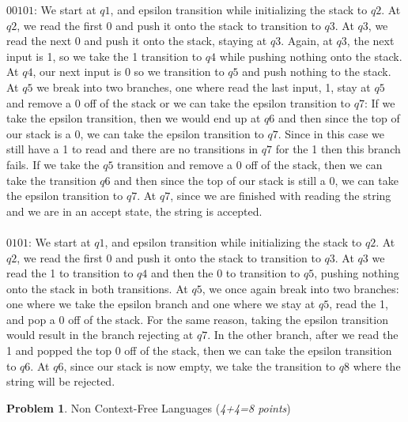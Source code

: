 \documentclass[11pt]{article}
\theoremstyle{definition}
\theoremstyle{theorem}
\newtheorem{prob}{Problem}
\begin{document}
\begin{enumerate}[label=(\alph*)]
$00101$: We start at $q1$, and epsilon transition while initializing the stack to $q2$. At $q2$, we read the first 0 and push it onto the stack to transition to $q3$. At $q3$, we read the next 0 and push it onto the stack, staying at $q3$. Again, at $q3$, the next input is 1, so we take the 1 transition to $q4$ while pushing nothing onto the stack. At $q4$, our next input is 0 so we transition to $q5$ and push nothing to the stack.
At $q5$ we break into two branches, one where read the last input, 1, stay at $q5$ and remove a 0 off of the stack or we can take the epsilon transition to $q7$: 
If we take the epsilon transition, then we would end up at $q6$ and then since the top of our stack is a 0, we can take the epsilon transition to $q7$. Since in this case we still have a 1 to read and there are no transitions in $q7$ for the 1 then this branch fails.
If we take the $q5$ transition and remove a 0 off of the stack, then we can take the transition $q6$ and then since the top of our stack is still a 0, we can take the epsilon transition to $q7$. At $q7$, since we are finished with reading the string and we are in an accept state, the string is accepted. \\~\\

$0101$: We start at $q1$, and epsilon transition while initializing the stack to $q2$. At $q2$, we read the first 0 and push it onto the stack to transition to $q3$. At $q3$ we read the 1 to transition to $q4$ and then the 0 to transition to $q5$, pushing nothing onto the stack in both transitions.
At $q5$, we once again break into two branches: one where we take the epsilon branch and one where we stay at $q5$, read the 1, and pop a 0 off of the stack. For the same reason, taking the epsilon transition would result in the branch rejecting at $q7$. In the other branch, after we read the 1 and popped the top 0 off of the stack, then we can take the epsilon transition to $q6$. At $q6$, since our stack is now empty, we take the transition to $q8$ where the string will be rejected.









\newpage

\begin{prob} Non Context-Free Languages (\emph{4+4=8 points})\end{prob}

\begin{enumerate}[label=(\alph*)]


\end{enumerate}
\end{enumerate}
\end{document}
